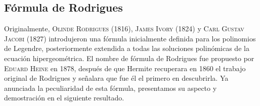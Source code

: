 \subsection{Fórmula de Rodrigues}
\label{subsection:Rodrigues}

Originalmente, \textsc{Olinde Rodrigues} (1816), \textsc{James Ivory} (1824) y \textsc{Carl Gustav Jacobi} (1827) introdujeron una fórmula inicialmente definida para los polinomios de Legendre, posteriormente extendida a todas las soluciones polinómicas de la ecuación hipergeométrica. El nombre de fórmula de Rodrigues fue propuesto por \textsc{Eduard Heine} en 1878, después de que Hermite recuperara en 1860 el trabajo original de Rodrigues y señalara que fue él el primero en descubrirla. Ya anunciada la peculiaridad de esta fórmula, presentamos su aspecto y demostración en el siguiente resultado.

